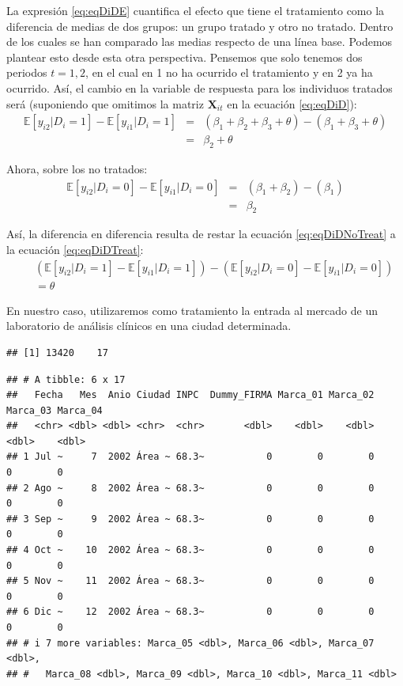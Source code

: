 \documentclass[
]{book}
\begin{document}
La expresión \eqref{eq:eqDiDE} cuantifica el efecto que tiene el tratamiento como la diferencia de medias de dos grupos: un grupo tratado y otro no tratado. Dentro de los cuales se han comparado las medias respecto de una línea base. Podemos plantear esto desde esta otra perspectiva. Pensemos que solo tenemos dos periodos \(t = {1, 2}\), en el cual en 1 no ha ocurrido el tratamiento y en 2 ya ha ocurrido. Así, el cambio en la variable de respuesta para los individuos tratados será (suponiendo que omitimos la matriz \(\mathbf{X}_{it}\) en la ecuación \eqref{eq:eqDiD}):
\begin{eqnarray}
    \mathbb{E}[ y_{i2} | D_i = 1 ] - \mathbb{E}[ y_{i1} | D_i = 1 ] & = & ( \beta_1 + \beta_2 + \beta_3 + \theta ) - ( \beta_1 + \beta_3 + \theta ) \nonumber \\  
    & = & \beta_2 + \theta 
    \label{eq:eqDiDTreat}
\end{eqnarray}

Ahora, sobre los no tratados:
\begin{eqnarray}
    \mathbb{E}[ y_{i2} | D_i = 0 ] - \mathbb{E}[ y_{i1} | D_i = 0 ] & = & ( \beta_1 + \beta_2 ) - ( \beta_1 ) \nonumber \\  
    & = & \beta_2 
    \label{eq:eqDiDNoTreat}
\end{eqnarray}

Así, la diferencia en diferencia resulta de restar la ecuación \eqref{eq:eqDiDNoTreat} a la ecuación \eqref{eq:eqDiDTreat}:
\begin{eqnarray}
    & & ( \mathbb{E}[ y_{i2} | D_i = 1 ] - \mathbb{E}[ y_{i1} | D_i = 1 ] ) - ( \mathbb{E}[ y_{i2} | D_i = 0 ] - \mathbb{E}[ y_{i1} | D_i = 0 ] ) \nonumber \\ 
    & & = \theta 
    \label{eq:eqAplicada}
\end{eqnarray}

En nuestro caso, utilizaremos como tratamiento la entrada al mercado de un laboratorio de análisis clínicos en una ciudad determinada.

\begin{verbatim}
## [1] 13420    17
\end{verbatim}

\begin{verbatim}
## # A tibble: 6 x 17
##   Fecha   Mes  Anio Ciudad INPC  Dummy_FIRMA Marca_01 Marca_02 Marca_03 Marca_04
##   <chr> <dbl> <dbl> <chr>  <chr>       <dbl>    <dbl>    <dbl>    <dbl>    <dbl>
## 1 Jul ~     7  2002 Área ~ 68.3~           0        0        0        0        0
## 2 Ago ~     8  2002 Área ~ 68.3~           0        0        0        0        0
## 3 Sep ~     9  2002 Área ~ 68.3~           0        0        0        0        0
## 4 Oct ~    10  2002 Área ~ 68.3~           0        0        0        0        0
## 5 Nov ~    11  2002 Área ~ 68.3~           0        0        0        0        0
## 6 Dic ~    12  2002 Área ~ 68.3~           0        0        0        0        0
## # i 7 more variables: Marca_05 <dbl>, Marca_06 <dbl>, Marca_07 <dbl>,
## #   Marca_08 <dbl>, Marca_09 <dbl>, Marca_10 <dbl>, Marca_11 <dbl>
\end{verbatim}
\end{document}
